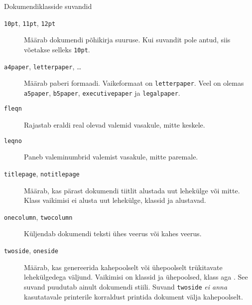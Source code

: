 {\begin{table}[tp]
\caption{Dokumendiklasside suvandid} \label{options}
\begin{lined}{\textwidth}
\begin{description}
\item[\normalfont\texttt{10pt}, \texttt{11pt}, \texttt{12pt}] \quad
  Määrab dokumendi põhikirja suuruse. Kui suvandit pole antud, siis
  võetakse selleks \texttt{10pt}.%

\item[\normalfont\texttt{a4paper}, \texttt{letterpaper}, \ldots] \quad
  Määrab paberi formaadi. Vaikeformaat on \texttt{letterpaper}. Veel on
  olemas \texttt{a5paper}, \texttt{b5paper}, \texttt{executivepaper} ja
  \texttt{legalpaper}.

\item[\normalfont\texttt{fleqn}] \quad Rajastab eraldi real olevad
  valemid vasakule, mitte keskele.

\item[\normalfont\texttt{leqno}] \quad Paneb valeminumbrid valemist
  vasakule, mitte paremale.

\item[\normalfont\texttt{titlepage}, \texttt{notitlepage}] \quad Määrab,
  kas pärast dokumendi tiitlit alustada uut lehekülge või
  mitte. Klass  vaikimisi ei alusta uut lehekülge,
  klassid  ja  alustavad. 

\item[\normalfont\texttt{onecolumn}, \texttt{twocolumn}] \quad Küljendab
  dokumendi teksti ühes veerus või
  kahes veerus.

\item[\normalfont\texttt{twoside}, \texttt{oneside}] \quad Määrab, kas
  genereerida kahepoolselt või ühepoolselt trükitavate lehekülgedega
  väljund. Vaikimisi on klassid  ja 
  ühepoolsed, klass  aga
  . See suvand puudutab ainult
  dokumendi stiili. Suvand \texttt{twoside} \emph{ei anna} kasutatavale
  printerile korraldust printida dokument välja kahepoolselt.


\end{description}
\end{lined}
\end{table}}
